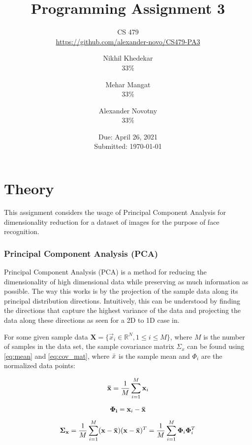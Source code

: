 \documentclass[headings=optiontoheadandtoc,listof=totoc,parskip=full]{scrartcl}
\title{Programming Assignment 3}
\subtitle{CS 479\\\url{https://github.com/alexander-novo/CS479-PA3}}
\author{Nikhil Khedekar\\33\%\\\Cref{sec:part-3} \and Mehar Mangat\\33\%\\\Cref{sec:part-3} \and Alexander Novotny\\33\%\\\Cref{sec:part-1}}
\date{Due: April 26, 2021 \\ Submitted: \today}
\def \reals {\mathbb{R}}
\begin{document}
\maketitle
\tableofcontents
{}

\newpage
{}


\section{Theory}

This assignment considers the usage of Principal Component Analysis for dimensionality reduction for a dataset of images for the purpose of face recognition. 

\subsubsection{Principal Component Analysis (PCA)}
Principal Component Analysis (PCA) is a method for reducing the dimensionality of high dimensional data while preserving as much information as possible. The way this works is by the projection of the sample data along its principal distribution directions. Intuitively, this can be understood by finding the directions that capture the highest variance of the data and projecting the data along these directions as seen for a 2D to 1D case in. 


For some given sample data $\mathbf{X} = \{\vec x_i \in \reals^N, 1 \leq i \leq M\}$, where $M$ is the number of samples in the data set, the sample covariance matrix $\Sigma_x$ can be found using \cref{eq:mean} and \cref{eq:cov_mat}, where $\Bar{x}$ is the sample mean and $\Phi_i$ are the normalized data points:

\begin{equation} \label{eq:mean}
    \mathbf{\Bar{x}} = \frac{1}{M}\sum_{i = 1}^{M}\mathbf{x}_i
\end{equation}

\begin{equation}
    \mathbf{\Phi_i} = \mathbf{x}_i - \mathbf{\Bar{x}}
\end{equation}

\begin{equation} \label{eq:cov_mat}
    \mathbf{\Sigma_x} = \frac{1}{M}\sum_{i = 1}^M(\mathbf{x} - \mathbf{\Bar{x}})(\mathbf{x} - \mathbf{\Bar{x}})^T = \frac{1}{M}\sum_{i = 1}^{M}\mathbf{\Phi}_i\mathbf{\Phi}_i^T 
\end{equation}
\end{document}
